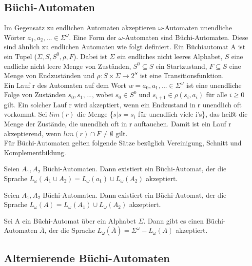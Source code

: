 \subsection{Büchi-Automaten}
Im Gegensatz zu endlichen Automaten akzeptieren $\omega$-Automaten unendliche Wörter $a_1,a_2,...\in \Sigma^{\omega}$. Eine Form der $\omega$-Automaten sind Büchi-Automaten. Diese sind ähnlich zu endlichen Automaten wie folgt definiert. Ein Büchiautomat A ist ein Tupel ($\Sigma, S, S^0, \rho, F$). Dabei ist $\Sigma$ ein endliches nicht leeres Alphabet, $S$ eine endliche nicht leere Menge von Zuständen, $S^0\subseteq S$ ein Startzustand, $F\subseteq S$ eine Menge von Endzuständen und $\rho : S \times \Sigma \rightarrow 2^S$ ist eine Transitionsfunktion.\\
Ein Lauf r des Automaten auf dem Wort $w=a_0,a_1,... \in \Sigma^{\omega}$ ist eine unendliche Folge von Zuständen $s_0,s_1,...$, wobei $s_0 \in S^0$ und $s_{i+1} \in \rho(s_i, a_i)$ für alle $i \geq 0$ gilt. Ein solcher Lauf r wird akzeptiert, wenn ein Endzustand in r unendlich oft vorkommt. Sei $lim(r)$ die Menge \{$s|s=s_i$ für unendlich viele i's\}, das heißt die Menge der Zustände, die unendlich oft in r auftauchen. Damit ist ein Lauf r akzeptierend, wenn $lim(r)\cap F \neq \emptyset$ gilt.\\
Für Büchi-Automaten gelten folgende Sätze bezüglich Vereinigung, Schnitt und Komplementbildung. \\
\begin{satz}\cite{choueka74}
Seien $A_1, A_2$ Büchi-Automaten. Dann existiert ein Büchi-Automat, der die Sprache $L_{\omega}(A_1\cup A_2)=L_{\omega}(a_1)\cup L_{\omega}(A_2)$ akzeptiert.
\end{satz}
\begin{satz}\cite{choueka74}
Seien $A_1, A_2$ Büchi-Automaten. Dann existiert ein Büchi-Automat, der die Sprache $L_{\omega}(A)=L_{\omega}(A_1)\cup L_{\omega}(A_2)$ akzeptiert.
\end{satz}
\begin{satz}\cite{buechi62}
Sei A ein Büchi-Automat über ein Alphabet $\Sigma$. Dann gibt es einen Büchi-Automaten $\overline{A}$, der die Sprache $L_\omega(\overline{A})=\Sigma^\omega - L_\omega(A)$ akzeptiert.
\end{satz}


\subsection{Alternierende Büchi-Automaten}

